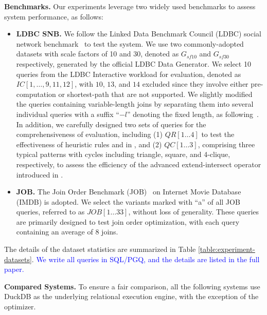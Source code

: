 \noindent\textbf{Benchmarks.} Our experiments leverage two widely used benchmarks to assess system performance, as follows:
\begin{itemize}
    \item \textbf{LDBC SNB.} We follow the Linked Data Benchmark Council (LDBC) social network benchmark~\cite{ldbc_snb} to test the system. We use two commonly-adopted datasets with scale factors of 10 and 30, denoted as $G_{sf10}$ and $G_{sf30}$ respectively, generated by the official LDBC Data Generator.
    We select 10 queries from the LDBC Interactive workload for evaluation, denoted as $IC[1, \ldots, 9, 11, 12]$, with $10$, $13$, and $14$ excluded since they involve either pre-computation or shortest-path that are not supported.
    We slightly modified the queries containing variable-length joins by separating them into several individual queries with a suffix ``$-l$'' denoting the fixed length, as following~\cite{graindb}.
    In addition, we carefully designed two sets of queries for the comprehensiveness of evaluation, including (1) $QR[1\ldots 4]$ to test the effectiveness of heuristic rules \filterrule and \joinfuserule in \name, and (2) $QC[1\ldots 3]$, comprising three typical patterns with cycles including triangle, square, and 4-clique, respectively, to assess the efficiency of the advanced extend-intersect operator introduced in \name.
    \item \textbf{JOB.} The Join Order Benchmark (JOB)~\cite{job_snb} on Internet Movie Database (IMDB) is adopted. We select the variants marked with ``a'' of all JOB queries, referred to as $JOB[1\ldots 33]$, without loss of generality. These queries are primarily designed to test join order optimization, with each query containing an average of $8$ joins.
\end{itemize}
The details of the dataset statistics are summarized in Table \ref{table:experiment-datasets}.
\textcolor{blue}{We write all queries in SQL/PGQ, and the details are listed in the full paper.}

\noindent\textbf{Compared Systems. }
To ensure a fair comparison, all the following systems use DuckDB as the underlying relational execution engine, with the exception of the optimizer.

